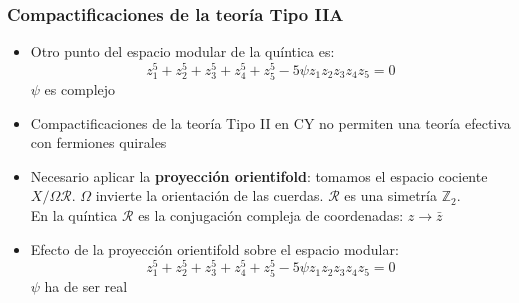 \documentclass{beamer}
\begin{document}
\begin{frame}
  \frametitle{Compactificaciones de la teoría Tipo IIA}
  \begin{itemize}
    \item Otro punto del espacio modular de la quíntica es:
      \begin{equation*}
        z_1^5+z_2^5+z_3^5+z_4^5+z_5^5-5\psi z_1 z_2 z_3 z_4 z_5=0 
      \end{equation*}
      $\psi$ es complejo
    \item Compactificaciones de la teoría Tipo II en CY no permiten una teoría efectiva con fermiones quirales
    \item Necesario aplicar la \textbf{proyección orientifold}: tomamos el espacio cociente $X/\Omega \mathcal R$.
      $\Omega$ invierte la orientación de las cuerdas. $\mathcal R$ es una simetría $\mathbb Z_2$.\\
      En la quíntica $\mathcal R$ es la conjugación compleja de coordenadas: $z\to\bar z$
    \item Efecto de la proyección orientifold sobre el espacio modular:
      \begin{equation*}
        z_1^5+z_2^5+z_3^5+z_4^5+z_5^5-5\psi z_1 z_2 z_3 z_4 z_5=0 
      \end{equation*}
      $\psi$ ha de ser real
  \end{itemize}
\end{frame}
\end{document}
